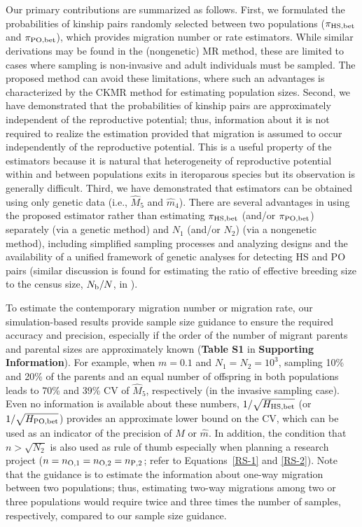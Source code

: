 \documentclass[12pt, English]{article}
\begin{document}
\begin{spacing}{1.9}
Our primary contributions are summarized as follows. First, we formulated the probabilities of kinship pairs randomly selected between two populations ($\pi_{\rm HS,bet}$ and $\pi_{\rm PO,bet}$), which provides migration number or rate estimators. While similar derivations may be found in the (nongenetic) MR method, these are limited to cases where sampling is non-invasive and adult individuals must be sampled. The proposed method can avoid these limitations, where such an advantages is characterized by the CKMR method for estimating population sizes. Second, we have demonstrated that the probabilities of kinship pairs are approximately independent of the reproductive potential; thus, information about it is not required to realize the estimation provided that migration is assumed to occur independently of the reproductive potential. This is a useful property of the estimators because it is natural that heterogeneity of reproductive potential within and between populations exits in iteroparous species but its observation is generally difficult. Third, we have demonstrated that estimators can be obtained using only genetic data (i.e., ${\hat M_5}$ and ${\hat m_4}$). There are several advantages in using the proposed estimator rather than estimating $\pi_{\rm HS,bet}$ (and/or $\pi_{\rm PO,bet}$) separately (via a genetic method) and $N_1$ (and/or $N_2$) (via a nongenetic method), including simplified sampling processes and analyzing designs and the availability of a unified framework of genetic analyses for detecting HS and PO pairs (similar discussion is found for estimating the ratio of effective breeding size to the census size, $N_{\rm b}/N$, in \cite{Akita_2020}). 

To estimate the contemporary migration number or migration rate, our simulation-based results provide sample size guidance to ensure the required accuracy and precision, especially if the order of the number of migrant parents and parental sizes are approximately known ({\bf Table S1} in {\bf Supporting Information}). For example, when $m=0.1$ and $N_1=N_2=10^3$, sampling 10\% and 20\% of the parents and an equal number of offspring in both populations leads to 70\% and 39\% CV of ${\hat M_5}$, respectively (in the invasive sampling case). Even no information is available about these numbers, $1/\sqrt{H_{\rm HS, bet}}$ (or $1/\sqrt{H_{\rm PO, bet}}$) provides an approximate lower bound on the CV, which can be used as an indicator of the precision of ${\hat M}$ or ${\hat m}$. In addition, the condition that $n>\sqrt{N_2}$ is also used as rule of thumb especially when planning a research project ($n = n_{\rm O, 1}=n_{\rm O, 2}=n_{\rm P, 2}$; refer to Equations~\ref{RS-1} and \ref{RS-2}). Note that the guidance is to estimate the information about one-way migration between two populations; thus, estimating two-way migrations among two or three populations would require twice and three times the number of samples, respectively, compared to our sample size guidance. 


\end{spacing}
\end{document}
